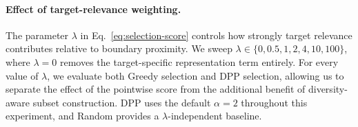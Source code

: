 \paragraph{Effect of target-relevance weighting.}
The parameter $\lambda$ in Eq.~\eqref{eq:selection-score} controls how
strongly target relevance contributes relative to boundary proximity.
We sweep $\lambda\in\{0,0.5,1,2,4,10,100\}$, where $\lambda=0$ removes the
target-specific representation term entirely. For every value of
$\lambda$, we evaluate both Greedy selection and DPP selection, allowing
us to separate the effect of the pointwise score from the additional
benefit of diversity-aware subset construction. DPP uses the default
$\alpha=2$ throughout this experiment, and Random provides a
$\lambda$-independent baseline.

\begin{table}[t]
\centering
\caption{
Sensitivity to the target-relevance weight $\lambda$. We evaluate
Greedy (G) and DPP (D) selection for each value of $\lambda$, with
$\alpha=2$ for DPP. Experiments use SAPA on dog--bird. Entries report
ASR (\%), with clean test accuracy in parentheses.
}
\label{tab:lambda-ablation}
\small
\setlength{\tabcolsep}{3.0pt}
\renewcommand{\arraystretch}{1.10}
\end{table}
